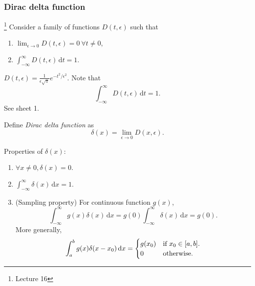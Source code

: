 \documentclass[a4paper]{article}
\begin{document}
      \subsubsection{Dirac delta function}\footnote{Lecture 16}
      Consider a family of functions $ D(t,\epsilon) $ such that 
      \begin{enumerate}
          \item $ \lim_{\epsilon \to 0} D(t,\epsilon)=0\  \forall t\neq 0 $,
          \item $\displaystyle \int_{-\infty}^{\infty} D(t,\epsilon) \,\mathrm{d}t =1$.
      \end{enumerate}
      \begin{example}
          $\displaystyle D(t,\epsilon)=\frac{1}{\epsilon\sqrt{\pi}}e^{-t^2/\epsilon^2} $. Note that
          \[
              \int_{-\infty}^{\infty} D(t,\epsilon) \,\mathrm{d}t=1
          .\]
          See sheet 1.
          \begin{center}
          \end{center}
      \end{example}
      \begin{definition}
        Define \textit{Dirac delta function} as 
        \[
            \delta(x)=\lim_{\epsilon \to 0} D(x,\epsilon)
        .\]
      \end{definition}
      Properties of $ \delta(x) $:
      \begin{enumerate}
          \item $ \forall x\neq 0, \delta(x)=0 $.
          \item $\displaystyle \int_{-\infty }^{\infty } \delta(x) \,\mathrm{d}x=1$.
          \item (Sampling property) For continuous function $g(x)$, 
          \[
              \int_{-\infty}^{\infty} g(x)\delta(x) \,\mathrm{d}x = g(0)\int_{-\infty}^{\infty}  \delta(x)\,\mathrm{d}x = g(0)
          .\]
          More generally,
          \begin{equation}\label{eq:generalised sampling property}
            \int_{a}^{b} g(x)\delta(x-x_0) \,\mathrm{d}x = \begin{cases}
                g(x_0) &\text{if $ x_0\in [a,b] $.}\\
                0 &\text{otherwise.}\\
                \end{cases} 
          \end{equation}
      \end{enumerate}
\end{document}
